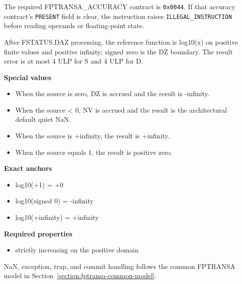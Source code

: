 The required FPTRANSA\_ACCURACY contract is \texttt{0x0044}. If that accuracy contract's \texttt{PRESENT} field is clear, the instruction raises \texttt{ILLEGAL\_INSTRUCTION} before reading operands or floating-point state.

After FSTATUS.DAZ processing, the reference function is log10(x) on positive finite values and positive infinity; signed zero is the DZ boundary. The result error is at most 4 ULP for S and 4 ULP for D.

\textbf{Special values}\par
\begin{itemize}
\item When the source is zero, DZ is accrued and the result is -infinity.
\item When the source \textless{} 0, NV is accrued and the result is the architectural default quiet NaN.
\item When the source is +infinity, the result is +infinity.
\item When the source equals 1, the result is positive zero.
\end{itemize}

\textbf{Exact anchors}\par
\begin{itemize}
\item log10(+1) = +0
\item log10(signed 0) = -infinity
\item log10(+infinity) = +infinity
\end{itemize}

\textbf{Required properties}\par
\begin{itemize}
\item strictly increasing on the positive domain
\end{itemize}

NaN, exception, trap, and commit handling follows the common FPTRANSA model in Section~\ref{section:fptransa-common-model}.

